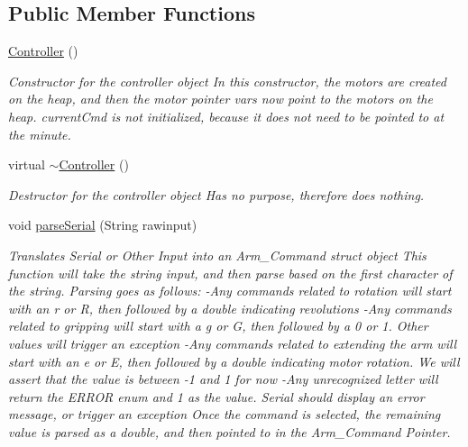 \subsection*{Public Member Functions}
\begin{DoxyCompactItemize}
\item 
\mbox{\label{class_controller_a95c56822d667e94b031451729ce069a9}} 
\hyperlink{class_controller_a95c56822d667e94b031451729ce069a9}{Controller} ()
\begin{DoxyCompactList}\small\item\em Constructor for the controller object In this constructor, the motors are created on the heap, and then the motor pointer vars now point to the motors on the heap. current\+Cmd is not initialized, because it does not need to be pointed to at the minute. \end{DoxyCompactList}\item 
\mbox{\label{class_controller_a0ab87934c4f7a266cfdb86e0f36bc1b5}} 
virtual \hyperlink{class_controller_a0ab87934c4f7a266cfdb86e0f36bc1b5}{$\sim$\+Controller} ()
\begin{DoxyCompactList}\small\item\em Destructor for the controller object Has no purpose, therefore does nothing. \end{DoxyCompactList}\item 
void \hyperlink{class_controller_ad7583687bca402756ed9a4a8dc2e29ee}{parse\+Serial} (String rawinput)
\begin{DoxyCompactList}\small\item\em Translates Serial or Other Input into an Arm\+\_\+\+Command struct object This function will take the string input, and then parse based on the first character of the string. Parsing goes as follows\+: -\/\+Any commands related to rotation will start with an \textquotesingle{}r\textquotesingle{} or \textquotesingle{}R\textquotesingle{}, then followed by a double indicating revolutions -\/\+Any commands related to gripping will start with a \textquotesingle{}g\textquotesingle{} or \textquotesingle{}G\textquotesingle{}, then followed by a 0 or 1. Other values will trigger an exception -\/\+Any commands related to extending the arm will start with an \textquotesingle{}e\textquotesingle{} or \textquotesingle{}E\textquotesingle{}, then followed by a double indicating motor rotation. We will assert that the value is between -\/1 and 1 for now -\/\+Any unrecognized letter will return the E\+R\+R\+OR enum and 1 as the value. Serial should display an error message, or trigger an exception Once the command is selected, the remaining value is parsed as a double, and then pointed to in the Arm\+\_\+\+Command Pointer. \end{DoxyCompactList}\item 

\end{DoxyCompactItemize}
